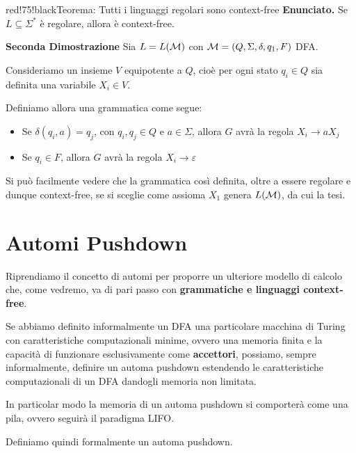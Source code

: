 \begin{halfframedbox}{red!75!black}{Teorema: Tutti i linguaggi regolari sono context-free}
  \textbf{Enunciato.} Se $L \subseteq \Sigma^*$ è regolare, allora è context-free.

  \begin{center}
    \textcolor{red!75!black}{\hdashrule[0.5ex]{18cm}{1pt}{3mm 3pt 1mm 2pt}}
  \end{center}

  \textbf{Seconda Dimostrazione}
    Sia $L = L(\mathcal{M}) $ con $\mathcal{M}=\displaystyle{\left({Q,\Sigma, \delta, q_1,F}\right)}$ DFA\@.

    Consideriamo un insieme $V$ equipotente a $Q$, cioè per ogni stato $q_i \in Q$ sia definita una variabile $X_i \in V$.

    Definiamo allora una grammatica come segue:
    \begin{itemize}
      \item Se $\delta(q_i,a)=q_j$, con $q_i,q_j \in Q$ e $a \in \Sigma$, allora $G$ avrà la regola $X_i \to aX_j$
      \item Se $q_i \in F$, allora $G$ avrà la regola $X_i \to \varepsilon$
    \end{itemize}

    Si può facilmente vedere che la grammatica così definita, oltre a essere regolare e dunque context-free, se si sceglie come assioma $X_1$ genera $L(\mathcal{M})$, da cui la tesi.
\end{halfframedbox}

\newpage

\section{Automi Pushdown}

Riprendiamo il concetto di automi per proporre un ulteriore modello di calcolo che, come vedremo, va di pari passo con \textbf{grammatiche e linguaggi context-free}.

Se abbiamo definito informalmente un DFA una particolare macchina di Turing con caratteristiche computazionali minime, ovvero una memoria finita e la capacità di funzionare esclusivamente come \textbf{accettori}, possiamo, sempre informalmente, definire un automa pushdown estendendo le caratteristiche computazionali di un DFA dandogli memoria non limitata.

In particolar modo la memoria di un automa pushdown si comporterà come una pila, ovvero seguirà il paradigma LIFO\@.

Definiamo quindi formalmente un automa pushdown.

